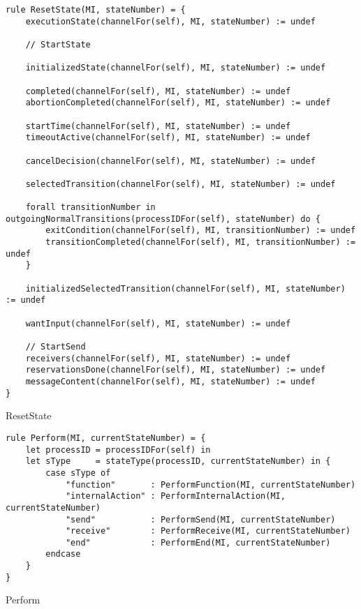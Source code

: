\begin{listing}[H]
\begin{verbatim}
rule ResetState(MI, stateNumber) = {
    executionState(channelFor(self), MI, stateNumber) := undef

    // StartState

    initializedState(channelFor(self), MI, stateNumber) := undef

    completed(channelFor(self), MI, stateNumber) := undef
    abortionCompleted(channelFor(self), MI, stateNumber) := undef

    startTime(channelFor(self), MI, stateNumber) := undef
    timeoutActive(channelFor(self), MI, stateNumber) := undef

    cancelDecision(channelFor(self), MI, stateNumber) := undef

    selectedTransition(channelFor(self), MI, stateNumber) := undef

    forall transitionNumber in outgoingNormalTransitions(processIDFor(self), stateNumber) do {
        exitCondition(channelFor(self), MI, transitionNumber) := undef
        transitionCompleted(channelFor(self), MI, transitionNumber) := undef
    }

    initializedSelectedTransition(channelFor(self), MI, stateNumber) := undef

    wantInput(channelFor(self), MI, stateNumber) := undef

    // StartSend
    receivers(channelFor(self), MI, stateNumber) := undef
    reservationsDone(channelFor(self), MI, stateNumber) := undef
    messageContent(channelFor(self), MI, stateNumber) := undef
}
\end{verbatim}
\caption{ResetState}
\label{lst:asm:ResetState}
\end{listing}




\begin{listing}[H]
\begin{verbatim}
rule Perform(MI, currentStateNumber) = {
    let processID = processIDFor(self) in
    let sType     = stateType(processID, currentStateNumber) in {
        case sType of
            "function"       : PerformFunction(MI, currentStateNumber)
            "internalAction" : PerformInternalAction(MI, currentStateNumber)
            "send"           : PerformSend(MI, currentStateNumber)
            "receive"        : PerformReceive(MI, currentStateNumber)
            "end"            : PerformEnd(MI, currentStateNumber)
        endcase
    }
}
\end{verbatim}
\caption{Perform}
\label{lst:asm:Perform}
\end{listing}




